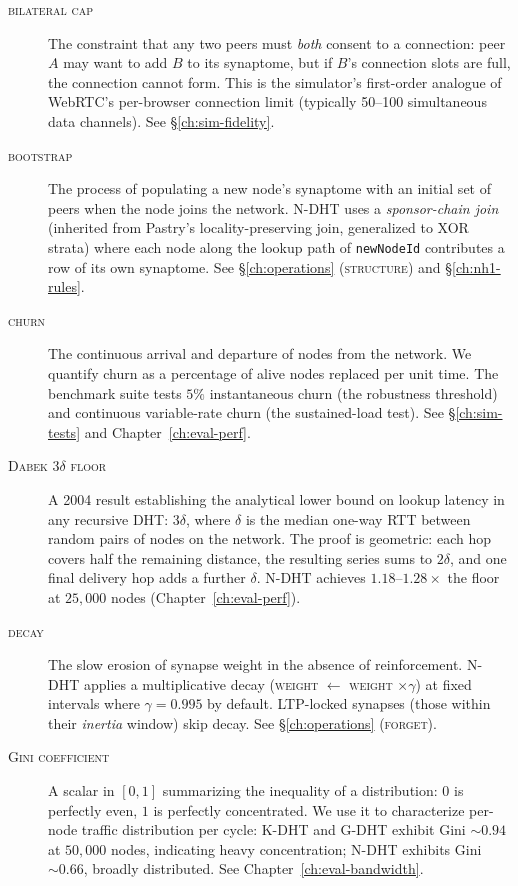 \documentclass[twoside,nobib]{tufte-book}
\newcommand{\NDHT}{N-DHT\xspace}
\newcommand{\KDHT}{K-DHT\xspace}
\newcommand{\GDHT}{G-DHT\xspace}
\begin{document}
\begin{description}
\item[\textsc{bilateral cap}]
The constraint that any two peers must \emph{both} consent to a
connection: peer $A$ may want to add $B$ to its synaptome, but if
$B$'s connection slots are full, the connection cannot form. This
is the simulator's first-order analogue of WebRTC's per-browser
connection limit (typically 50--100 simultaneous data channels).
See \S\ref{ch:sim-fidelity}.

\item[\textsc{bootstrap}]
The process of populating a new node's synaptome with an initial
set of peers when the node joins the network. \NDHT uses a
\emph{sponsor-chain join} (inherited from Pastry's
locality-preserving join, generalized to XOR strata) where each
node along the lookup path of \texttt{newNodeId} contributes a row
of its own synaptome. See \S\ref{ch:operations} (\textsc{structure})
and \S\ref{ch:nh1-rules}.

\item[\textsc{churn}]
The continuous arrival and departure of nodes from the network. We
quantify churn as a percentage of alive nodes replaced per unit
time. The benchmark suite tests $5\%$ instantaneous churn (the
robustness threshold) and continuous variable-rate churn (the
sustained-load test). See \S\ref{ch:sim-tests} and
Chapter~\ref{ch:eval-perf}.

\item[\textsc{Dabek $3\delta$ floor}]
A 2004 result establishing the analytical lower bound on lookup
latency in any recursive DHT: $3\delta$, where $\delta$ is the
median one-way RTT between random pairs of nodes on the network.
The proof is geometric: each hop covers half the remaining
distance, the resulting series sums to $2\delta$, and one final
delivery hop adds a further $\delta$. \NDHT achieves $1.18$--$1.28
\times$ the floor at $25{,}000$ nodes (Chapter~\ref{ch:eval-perf}).

\item[\textsc{decay}]
The slow erosion of synapse weight in the absence of reinforcement.
\NDHT applies a multiplicative decay (\textsc{weight} $\leftarrow$
\textsc{weight} $\times \gamma$) at fixed intervals where
$\gamma = 0.995$ by default. LTP-locked synapses (those within
their \emph{inertia} window) skip decay. See \S\ref{ch:operations}
(\textsc{forget}).

\item[\textsc{Gini coefficient}]
A scalar in $[0, 1]$ summarizing the inequality of a
distribution: $0$ is perfectly even, $1$ is perfectly
concentrated. We use it to characterize per-node traffic
distribution per cycle: \KDHT and \GDHT exhibit Gini $\sim
0.94$ at $50{,}000$ nodes, indicating heavy concentration; \NDHT
exhibits Gini $\sim 0.66$, broadly distributed. See
Chapter~\ref{ch:eval-bandwidth}.


\end{description}
\end{document}
